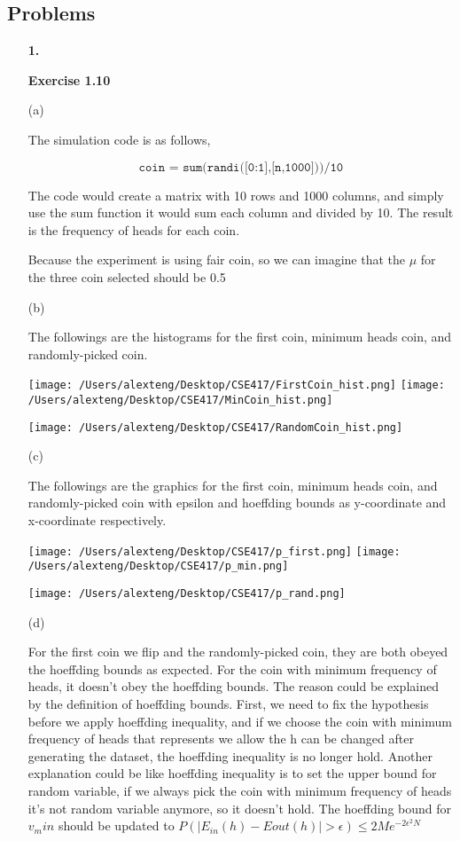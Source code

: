 \documentclass[11pt]{article}
\begin{document}
\subsection * {Problems}

\begin{enumerate}

\item [\textbf{1.}]  

\textbf{Exercise 1.10}

(a)

The simulation code is as follows,

$$\texttt{coin = sum(randi([0:1],[n,1000]))/10}$$

The code would create a matrix with 10 rows and 1000 columns, and simply use the sum function it would sum each column and divided by 10. The result is the frequency of heads for each coin.

Because the experiment is using fair coin, so we can imagine that the $\mu$ for the three coin selected should be 0.5

(b)

The followings are the histograms for the first coin, minimum heads coin, and randomly-picked coin.

\texttt{[image: /Users/alexteng/Desktop/CSE417/FirstCoin\_hist.png]}
\texttt{[image: /Users/alexteng/Desktop/CSE417/MinCoin\_hist.png]}

\texttt{[image: /Users/alexteng/Desktop/CSE417/RandomCoin\_hist.png]}

\pagebreak

(c)

The followings are the graphics for the first coin, minimum heads coin, and randomly-picked coin with epsilon and hoeffding bounds as y-coordinate and x-coordinate respectively.

\texttt{[image: /Users/alexteng/Desktop/CSE417/p\_first.png]}
\texttt{[image: /Users/alexteng/Desktop/CSE417/p\_min.png]}

\texttt{[image: /Users/alexteng/Desktop/CSE417/p\_rand.png]}

(d)

For the first coin we flip and the randomly-picked coin, they are both obeyed the hoeffding bounds as expected. For the coin with minimum frequency of heads, it doesn't obey the hoeffding bounds. The reason could be explained by the definition of hoeffding bounds. First, we need to fix the hypothesis before we apply hoeffding inequality, and if we choose the coin with minimum frequency of heads that represents we allow the h can be changed after generating the dataset, the hoeffding inequality is no longer hold. Another explanation could be like hoeffding inequality is to set the upper bound for random variable, if we always pick the coin with minimum frequency of heads it's not random variable anymore, so it doesn't hold. The hoeffding bound for $v_min$ should be updated to $P(|E_{in}(h) - E{out}(h)| > \epsilon) \leq 2Me^{-2\epsilon^2 N}$


\end{enumerate}
\end{document}
